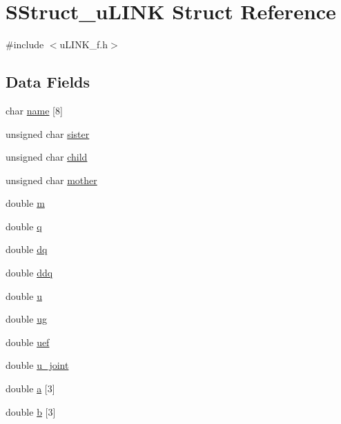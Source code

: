\hypertarget{struct_s_struct__u_l_i_n_k}{\section{S\-Struct\-\_\-u\-L\-I\-N\-K Struct Reference}
\label{struct_s_struct__u_l_i_n_k}
}


{\ttfamily \#include $<$u\-L\-I\-N\-K\-\_\-f.\-h$>$}

\subsection*{Data Fields}
\begin{DoxyCompactItemize}
\item 
char \hyperlink{struct_s_struct__u_l_i_n_k_aaf1bd07e95aeff0f585394fccaf479ab}{name} \mbox{[}8\mbox{]}
\item 
unsigned char \hyperlink{struct_s_struct__u_l_i_n_k_a68e11b780e786b30f244ec27648e7d96}{sister}
\item 
unsigned char \hyperlink{struct_s_struct__u_l_i_n_k_ac47adb81c2e9d7fccbe3f54dae7074f3}{child}
\item 
unsigned char \hyperlink{struct_s_struct__u_l_i_n_k_adc0805abf3c938fe0f37367d758b70a0}{mother}
\item 
double \hyperlink{struct_s_struct__u_l_i_n_k_a5175b356eac1d83a42608b42a25d00b9}{m}
\item 
double \hyperlink{struct_s_struct__u_l_i_n_k_a5b5e3f03e443adea974601f295136638}{q}
\item 
double \hyperlink{struct_s_struct__u_l_i_n_k_a7f417372d0026193269f02c43323b5b8}{dq}
\item 
double \hyperlink{struct_s_struct__u_l_i_n_k_a63253863f0cf910e3b007c37de0e5ffd}{ddq}
\item 
double \hyperlink{struct_s_struct__u_l_i_n_k_aed08c8478a62910aab06ba708a0e5b5f}{u}
\item 
double \hyperlink{struct_s_struct__u_l_i_n_k_a26599157c0b45c8f13eb679ca9a2a491}{ug}
\item 
double \hyperlink{struct_s_struct__u_l_i_n_k_a48e660e5c4e92e6b18ac669bf27e5972}{uef}
\item 
double \hyperlink{struct_s_struct__u_l_i_n_k_a4c825b6298857a29278ccd8a7b731863}{u\-\_\-joint}
\item 
double \hyperlink{struct_s_struct__u_l_i_n_k_a0910c359f02ae88168f5d9163f1e6b24}{a} \mbox{[}3\mbox{]}
\item 
double \hyperlink{struct_s_struct__u_l_i_n_k_a2afc6a29a6434245b3aef815cb9f62c0}{b} \mbox{[}3\mbox{]}

\end{DoxyCompactItemize}
